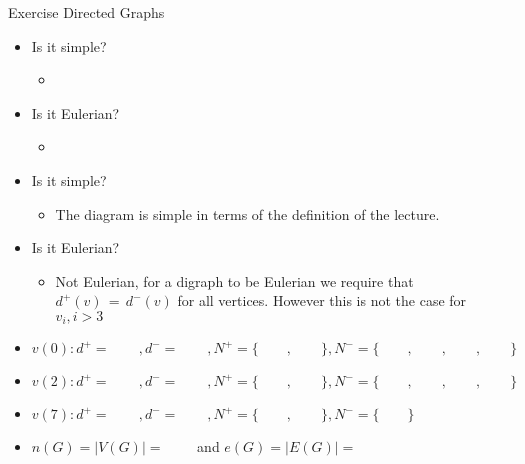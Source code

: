 \begin{frame}[allowframebreaks]{Exercise \thesection}{Directed Graphs}
  \begin{solution}
  \end{solution}
  \begin{solutionnoinc}
    \begin{itemize}
      \item Is it simple?
      \begin{itemize}
        \item[]
      \end{itemize}
      \item Is it Eulerian?
      \begin{itemize}
        \item[]
      \end{itemize}
    \end{itemize}
  \end{solutionnoinc}
  \begin{solution}
    \begin{itemize}
      \item Is it simple?
      \begin{itemize}
        \item The diagram is simple in terms of the definition of the lecture.
      \end{itemize}
      \item Is it Eulerian?
      \begin{itemize}
        \item Not Eulerian, for a digraph to be Eulerian we require that $d^{+}(v)\,=\,d^{-}(v)$ for all vertices. However this is not the case for $v_i, i > 3$
      \end{itemize}
    \end{itemize}
  \end{solution}
  \begin{solutionnoinc}
    \begin{itemize}
      \item $v(0): d^{+}=\qquad ,d^{-}=\qquad ,N^{+}=\{\qquad, \qquad\},N^{-}=\{\qquad ,\qquad ,\qquad ,\qquad \}$
      \item $v(2): d^{+}=\qquad ,d^{-}=\qquad ,N^{+}=\{\qquad, \qquad\},N^{-}=\{\qquad ,\qquad ,\qquad ,\qquad \}$
      \item $v(7): d^{+}=\qquad ,d^{-}=\qquad ,N^{+}=\{\qquad, \qquad\},N^{-}=\{\qquad \}$
      \item $n(G)=|V(G)|=\qquad$ and $e(G)=|E(G)|=\qquad$
    \end{itemize}

\end{solutionnoinc}
\end{frame}
